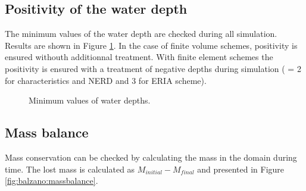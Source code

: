 


\subsection{Positivity of the water depth}

The minimum values of the water depth are checked during all simulation.
Results are shown in Figure \ref{t2d:balzano:minmax}.
In the case of finite volume schemes, positivity is ensured withouth additionnal
treatment.
With finite element schemes the positivity is ensured with a treatment of
negative depths during simulation ( = 2
for characteristics and NERD and 3 for ERIA scheme).

\begin{figure}[H]
\centering
{}
\caption{Minimum values of water depths.}
\label{t2d:balzano:minmax}
\end{figure}

\subsection{Mass balance}

Mass conservation can be checked by calculating the mass in the domain during
time. The lost mass is calculated as
$M_{initial} - M_{final}$ and presented in Figure \ref{fig:balzano:massbalance}.

